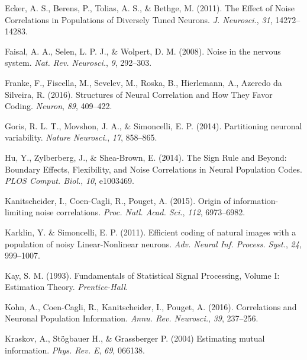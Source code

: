 \documentclass[12pt]{article}
\begin{document}
\begin{thebibliography}{100}
Ecker, A. S., Berens, P., Tolias, A. S., \& Bethge, M. (2011).
\newblock The Effect of Noise Correlations in Populations of Diversely Tuned Neurons.
\newblock \emph{J. Neurosci.}, \emph{31}, 14272--14283.

Faisal, A. A., Selen, L. P. J., \& Wolpert, D. M. (2008).
\newblock Noise in the nervous system.
\newblock \emph{Nat. Rev. Neurosci.}, \emph{9}, 292--303.

Franke, F., Fiscella, M., Sevelev, M., Roska, B., Hierlemann, A., Azeredo da Silveira, R. (2016).
\newblock Structures of Neural Correlation and How They Favor Coding.
\newblock \emph{Neuron}, \emph{89}, 409--422.

Goris, R. L. T., Movshon, J. A., \& Simoncelli, E. P. (2014).
\newblock Partitioning neuronal variability.
\newblock \emph{Nature Neurosci.}, \emph{17}, 858--865.

Hu, Y., Zylberberg, J., \& Shea-Brown, E. (2014).
\newblock The Sign Rule and Beyond: Boundary Effects, Flexibility, and Noise Correlations in Neural Population Codes. 
\newblock \emph{PLOS Comput. Biol.}, \emph{10}, e1003469.

Kanitscheider, I., Coen-Cagli, R., Pouget, A. (2015).
\newblock Origin of information-limiting noise correlations.
\newblock \emph{Proc. Natl. Acad. Sci.}, \emph{112}, 6973--6982.

Karklin, Y. \& Simoncelli, E. P. (2011).
\newblock Efficient coding of natural images with a population of noisy
Linear-Nonlinear neurons.
\newblock \emph{Adv. Neural Inf. Process. Syst.}, \emph{24}, 999--1007.

Kay, S. M. (1993).
\newblock Fundamentals of Statistical Signal Processing, Volume I: Estimation Theory.
\newblock \emph{Prentice-Hall}.

Kohn, A., Coen-Cagli, R., Kanitscheider, I., Pouget, A. (2016).
\newblock Correlations and Neuronal Population Information.
\newblock \emph{Annu. Rev. Neurosci.}, \emph{39}, 237--256.

Kraskov, A., St{\"o}gbauer H., \& Grassberger P. (2004)
\newblock Estimating mutual information.
\newblock \emph{Phys. Rev. E},
\emph{69}, 066138.


\end{thebibliography}
\end{document}
